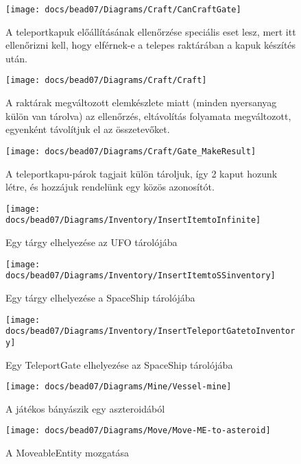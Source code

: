 \documentclass[../../projlab]{subfiles}
\begin{document}
\begin{figure}[H] 
    \centering 
    \texttt{[image: docs/bead07/Diagrams/Craft/CanCraftGate]} 
    \caption{A teleportkapuk előállításának ellenőrzése speciális eset lesz, mert itt ellenőrizni kell, hogy elférnek-e a telepes raktárában a kapuk készítés után.} 
\end{figure} 

\begin{figure}[H] 
    \centering 
    \texttt{[image: docs/bead07/Diagrams/Craft/Craft]} 
    \caption{A raktárak megváltozott elemkészlete miatt (minden nyersanyag külön van tárolva) az ellenőrzés, eltávolítás folyamata megváltozott, egyenként távolítjuk el az összetevőket. } 
\end{figure} 

\begin{figure}[H] 
    \centering 
    \texttt{[image: docs/bead07/Diagrams/Craft/Gate\_MakeResult]} 
    \caption{A teleportkapu-párok tagjait külön tároljuk, így 2 kaput hozunk létre, és hozzájuk rendelünk egy közös azonosítót.} 
\end{figure} 

\begin{figure}[H] 
    \centering 
    \texttt{[image: docs/bead07/Diagrams/Inventory/InsertItemtoInfinite]} 
    \caption{Egy tárgy elhelyezése az UFO tárolójába} 
\end{figure} 

\begin{figure}[H] 
    \centering 
    \texttt{[image: docs/bead07/Diagrams/Inventory/InsertItemtoSSinventory]} 
    \caption{Egy tárgy elhelyezése a SpaceShip tárolójába} 
\end{figure} 

\begin{figure}[H] 
    \centering 
    \texttt{[image: docs/bead07/Diagrams/Inventory/InsertTeleportGatetoInventory]} 
    \caption{Egy TeleportGate elhelyezése az SpaceShip tárolójába} 
\end{figure}

\begin{figure}[H] 
    \centering 
    \texttt{[image: docs/bead07/Diagrams/Mine/Vessel-mine]} 
    \caption{A játékos bányászik egy aszteroidából} 
\end{figure} 

\begin{figure}[H] 
    \centering 
    \texttt{[image: docs/bead07/Diagrams/Move/Move-ME-to-asteroid]} 
    \caption{A MoveableEntity mozgatása} 
\end{figure} 
\end{document}

